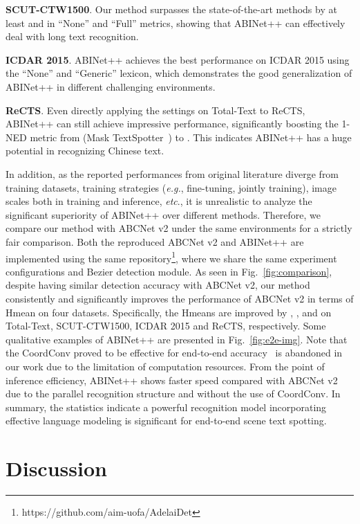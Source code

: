 \documentclass[10pt,journal,compsoc]{IEEEtran}
\def\eg{{\it e.g.}\xspace}
\def\etc{{\it etc}\xspace}
\begin{document}
\textbf{SCUT-CTW1500}. Our method surpasses the state-of-the-art methods by at least  and  in “None” and “Full” metrics, showing that ABINet++ can effectively deal with long text recognition.

\textbf{ICDAR 2015}. ABINet++ achieves the best performance on ICDAR 2015 using the “None” and “Generic” lexicon, which demonstrates the good generalization of ABINet++ in different challenging environments.

\textbf{ReCTS}. Even directly applying the settings on Total-Text to ReCTS, ABINet++ can still achieve impressive performance, significantly boosting the 1-NED metric from  (Mask TextSpotter~\cite{liao2019mask}) to . This indicates ABINet++ has a huge potential in recognizing Chinese text.


In addition, as the reported performances from original literature diverge from training datasets, training strategies (\eg, fine-tuning, jointly training), image scales both in training and inference, \etc., it is unrealistic to analyze the significant superiority of ABINet++ over different methods. Therefore, we compare our method with ABCNet v2 under the same environments for a strictly fair comparison. Both the reproduced ABCNet v2 and ABINet++ are implemented using the same repository\footnote{https://github.com/aim-uofa/AdelaiDet}, where we share the same experiment configurations and Bezier detection module. As seen in Fig.~\ref{fig:comparison}, despite having similar detection accuracy with ABCNet v2, our method consistently and significantly improves the performance of ABCNet v2 in terms of Hmean on four datasets. Specifically, the Hmeans are improved by , ,  and  on Total-Text, SCUT-CTW1500, ICDAR 2015 and ReCTS, respectively. Some qualitative examples of ABINet++ are presented in Fig.~\ref{fig:e2e-img}. Note that the CoordConv proved to be effective for end-to-end accuracy~\cite{liu2020abcnetv2} is abandoned in our work due to the limitation of computation resources. From the point of inference efficiency, ABINet++ shows faster speed compared with ABCNet v2 due to the parallel recognition structure and without the use of CoordConv. In summary, the statistics indicate a powerful recognition model incorporating effective language modeling is significant for end-to-end scene text spotting.





\section{Discussion}
\end{document}
